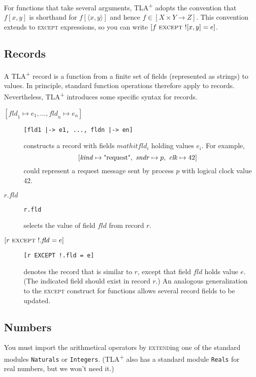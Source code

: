 \documentclass[11pt,fleqn]{article}
\newcommand{\tlaplus}{TLA\textsuperscript{+}\xspace}
\newcommand{\kw}[1]{\textnormal{\textsc{#1}}}
\newcommand{\seq}[1]{\ensuremath{\langle #1 \rangle}}
\newcommand{\str}[1]{\textnormal{"#1"}}
\newcommand{\EXCEPT}{\kw{except}}
\newcommand{\EXTEND}{\kw{extend}}
\begin{document}
For functions that take several arguments, \tlaplus adopts the convention that
$f[x,y]$ is shorthand for $f[\seq{x,y}]$ and hence $f \in [X \times Y
\rightarrow Z]$. This convention extends to \EXCEPT{} expressions, so you can
write $[f\ \EXCEPT\ ![x,y] = e]$.


\subsection{Records}

A \tlaplus record is a function from a finite set of fields (represented as
strings) to values. In principle, standard function operations therefore apply
to records. Nevertheless, \tlaplus introduces some specific syntax for records.

\begin{description}
\item[\mbox{$[\mathit{fld}_1 \mapsto e_1, \dots, \mathit{fld}_n \mapsto e_n]$}]\qquad
  \verb![fld1 |-> e1, ..., fldn |-> en]!

  constructs a record with fields $mathit{fld}_i$ holding values $e_i$. For
  example,
  \[
    [\mathit{kind} \mapsto \str{request},\
     \mathit{sndr} \mapsto p,\
     \mathit{clk} \mapsto 42]
  \]
  could represent a request message sent by process $p$ with logical clock value 42.

\item[$r.\mathit{fld}$]\qquad \verb|r.fld|

  selects the value of field $\mathit{fld}$ from record $r$.

\item[\mbox{$[r\ \EXCEPT\ !.\mathit{fld} = e]$}]\qquad
  \verb|[r EXCEPT !.fld = e]|

  denotes the record that is similar to $r$, except that field $\mathit{fld}$
  holds value $e$. (The indicated field should exist in record $r$.) An
  analogous generalization to the \EXCEPT{} construct for functions allows
  several record fields to be updated.
\end{description}


\subsection{Numbers}

You must import the arithmetical operators by \EXTEND{}ing one of the standard
modules \verb|Naturals| or \verb|Integers|. (\tlaplus also has a standard module
\verb|Reals| for real numbers, but we won't need it.)
\end{document}
